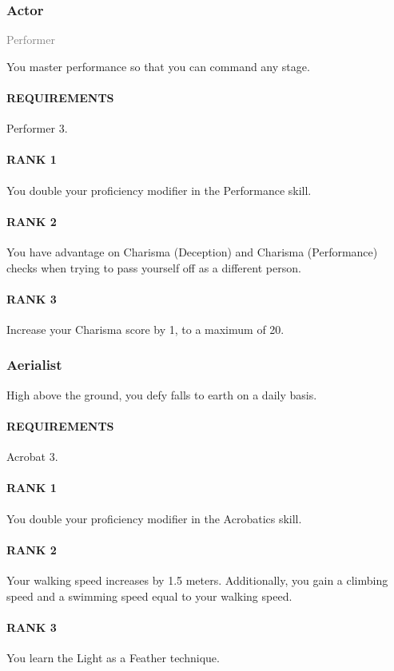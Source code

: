 \subsubsection{Actor} \label{feat::actor}
\small{\textcolor{gray}{Performer}}

\normalsize
You master performance so that you can command any stage.
\paragraph{REQUIREMENTS} Performer 3.
\paragraph{RANK 1} You double your proficiency modifier in the Performance skill.
\paragraph{RANK 2} You have advantage on Charisma (Deception) and Charisma (Performance) checks when trying to pass yourself off as a different person.
\paragraph{RANK 3} Increase your Charisma score by 1, to a maximum of 20.

\subsubsection{Aerialist} \label{feat::aerialist}
\small{\textcolor{gray}{}}

\normalsize
High above the ground, you defy falls to earth on a daily basis.
\paragraph{REQUIREMENTS} Acrobat 3.
\paragraph{RANK 1} You double your proficiency modifier in the Acrobatics skill.
\paragraph{RANK 2} Your walking speed increases by 1.5 meters.
Additionally, you gain a climbing speed and a swimming speed equal to your walking speed.
\paragraph{RANK 3} You learn the Light as a Feather technique.

